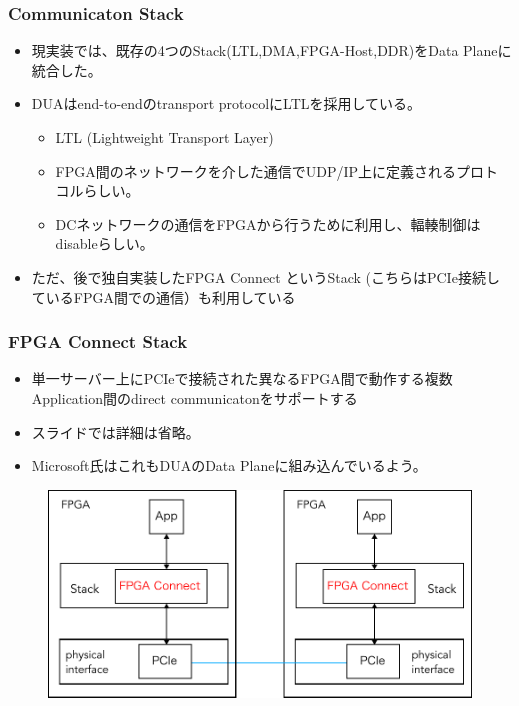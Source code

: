 \documentclass[dvipdfmx,9pt,notheorems]{beamer}
\theoremstyle{definition}
\begin{document}
\begin{frame}\frametitle{Communicaton Stack}
	\begin{itemize}
		\item 現実装では、既存の4つのStack(LTL,DMA,FPGA-Host,DDR)をData Planeに統合した。
		\item DUAはend-to-endのtransport protocolにLTLを採用している。
			\begin{itemize}
				\item LTL (Lightweight Transport Layer)
				\item FPGA間のネットワークを介した通信でUDP/IP上に定義されるプロトコルらしい。
				\item DCネットワークの通信をFPGAから行うために利用し、輻輳制御はdisableらしい。
			\end{itemize}
		\item ただ、後で独自実装したFPGA Connect というStack (こちらはPCIe接続しているFPGA間での通信）も利用している
	\end{itemize}
\pnote{
}
\end{frame}

\begin{frame}\frametitle{FPGA Connect Stack}
	\begin{itemize}
		\item 単一サーバー上にPCIeで接続された異なるFPGA間で動作する複数Application間のdirect communicatonをサポートする
		\item スライドでは詳細は省略。
		\item Microsoft氏はこれもDUAのData Planeに組み込んでいるよう。
	\end{itemize}
  \begin{figure}[htb]
		\includegraphics[scale=0.5]{fig/ez_FPGA_Connect.pdf}
  \end{figure}
\pnote{
}
\end{frame}
\end{document}
